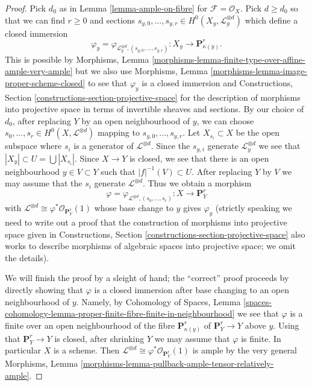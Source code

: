 \documentclass{stacks-project}
\theoremstyle{plain}
\theoremstyle{definition}
\theoremstyle{remark}
\numberwithin{equation}{subsection}
\begin{document}
\begin{proof}
Pick $d_0$ as in Lemma \ref{lemma-ample-on-fibre} for
$\mathcal{F} = \mathcal{O}_X$. Pick $d \geq d_0$
so that we can find $r \geq 0$ and sections
$s_{y, 0}, \ldots, s_{y, r} \in H^0(X_y, \mathcal{L}_y^{\otimes d})$
which define a closed immersion
$$
\varphi_y =
\varphi_{\mathcal{L}_y^{\otimes d}, (s_{y, 0}, \ldots, s_{y, r})} :
X_y \to \mathbf{P}^r_{\kappa(y)}.
$$
This is possible by Morphisms, Lemma
\ref{morphisms-lemma-finite-type-over-affine-ample-very-ample}
but we also use
Morphisms, Lemma \ref{morphisms-lemma-image-proper-scheme-closed}
to see that $\varphi_y$ is a closed immersion and
Constructions, Section \ref{constructions-section-projective-space}
for the description of morphisms into projective
space in terms of invertible sheaves and sections.
By our choice of $d_0$, after replacing $Y$ by an open neighbourhood
of $y$, we can choose
$s_0, \ldots, s_r \in H^0(X, \mathcal{L}^{\otimes d})$
mapping to $s_{y, 0}, \ldots, s_{y, r}$.
Let $X_{s_i} \subset X$ be the open subspace where $s_i$
is a generator of $\mathcal{L}^{\otimes d}$. Since
the $s_{y, i}$ generate $\mathcal{L}_y^{\otimes d}$ we see that
$|X_y| \subset U = \bigcup |X_{s_i}|$. Since $X \to Y$ is closed,
we see that there is an open neighbourhood $y \in V \subset Y$
such that $|f|^{-1}(V) \subset U$. After replacing $Y$ by $V$ we may
assume that the $s_i$ generate $\mathcal{L}^{\otimes d}$. Thus we
obtain a morphism
$$
\varphi = \varphi_{\mathcal{L}^{\otimes d}, (s_0, \ldots, s_r)} :
X \longrightarrow \mathbf{P}^r_Y
$$
with $\mathcal{L}^{\otimes d} \cong \varphi^*\mathcal{O}_{\mathbf{P}^r_Y}(1)$
whose base change to $y$ gives $\varphi_y$ (strictly speaking we need
to write out a proof that the construction of morphisms into projective
space given in
Constructions, Section \ref{constructions-section-projective-space}
also works to describe morphisms of algebraic spaces into projective
space; we omit the details).

\medskip\noindent
We will finish the proof by a sleight of hand; the ``correct'' proof
proceeds by directly showing that $\varphi$ is a closed
immersion after base changing to an open neighbourhood of $y$.
Namely, by
Cohomology of Spaces, Lemma
\ref{spaces-cohomology-lemma-proper-finite-fibre-finite-in-neighbourhood}
we see that $\varphi$ is a finite over an open neighbourhood
of the fibre $\mathbf{P}^r_{\kappa(y)}$ of $\mathbf{P}^r_Y \to Y$
above $y$. Using that $\mathbf{P}^r_Y \to Y$ is closed, after
shrinking $Y$ we may assume that $\varphi$ is finite.
In particular $X$ is a scheme.
Then $\mathcal{L}^{\otimes d} \cong \varphi^*\mathcal{O}_{\mathbf{P}^r_Y}(1)$
is ample by the very general
Morphisms, Lemma \ref{morphisms-lemma-pullback-ample-tensor-relatively-ample}.
\end{proof}
\end{document}
